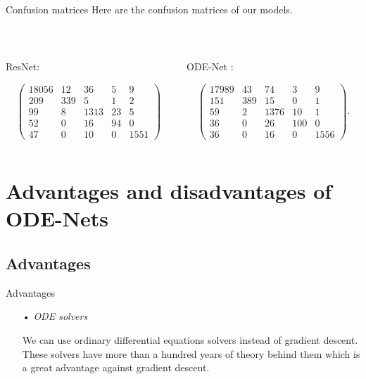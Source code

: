 \documentclass[11pt]{beamer}
\begin{document}
\begin{frame}{Confusion matrices}
Here are the confusion matrices of our models.

~

\begin{columns}
\begin{column}{5cm}
\begin{center}
ResNet:
  
$$
\begin{pmatrix}
18056 & 12 & 36 & 5 & 9 \\
209 & 339 & 5 & 1 & 2 \\
99 & 8 & 1313 & 23 & 5 \\
52 & 0 & 16 & 94 & 0 \\
47 & 0 & 10 & 0 & 1551
\end{pmatrix}
$$
\end{center}

\end{column}
\begin{column}{5cm}
\begin{center}
ODE-Net :
  
$$
\begin{pmatrix}
17989 & 43 & 74 & 3 & 9 \\
151 & 389 & 15 & 0 & 1 \\
59 & 2 & 1376 & 10 & 1 \\
36 & 0 & 26 & 100 & 0 \\
36 & 0 & 16 & 0 & 1556
\end{pmatrix}.
$$
\end{center}
\end{column}
\end{columns} 

\end{frame}

\section{Advantages and disadvantages of ODE-Nets}
\subsection*{Advantages}

\begin{frame}{Advantages}
\begin{itemize}
\item[•] \textit{ODE solvers}

We can use ordinary differential equations solvers instead of gradient descent. These solvers have more than a hundred years of theory behind them which is a great advantage against gradient descent.
\end{itemize}
\end{frame}
\end{document}
